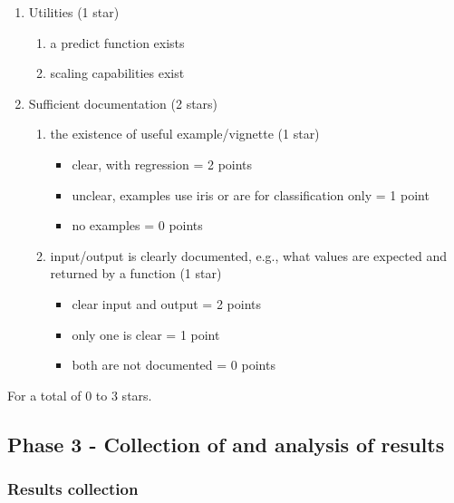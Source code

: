 \begin{enumerate}
\def\labelenumi{(\arabic{enumi})}
\tightlist
\item
  Utilities (1 star)

  \begin{enumerate}
  \def\labelenumii{(\alph{enumii})}
  \tightlist
  \item
    a predict function exists\\
  \item
    scaling capabilities exist
  \end{enumerate}
\item
  Sufficient documentation (2 stars)

  \begin{enumerate}
  \def\labelenumii{(\alph{enumii})}
  \tightlist
  \item
    the existence of useful example/vignette (1 star)

    \begin{itemize}
    \tightlist
    \item
      clear, with regression = 2 points
    \item
      unclear, examples use iris or are for classification only = 1
      point
    \item
      no examples = 0 points
    \end{itemize}
  \item
    input/output is clearly documented, e.g., what values are expected
    and returned by a function (1 star)

    \begin{itemize}
    \tightlist
    \item
      clear input and output = 2 points
    \item
      only one is clear = 1 point
    \item
      both are not documented = 0 points
    \end{itemize}
  \end{enumerate}
\end{enumerate}

For a total of 0 to 3 stars.

\hypertarget{phase-3---collection-of-and-analysis-of-results}{%
\subsection{Phase 3 - Collection of and analysis of
results}\label{phase-3---collection-of-and-analysis-of-results}}

\hypertarget{results-collection}{%
\subsubsection{Results collection}\label{results-collection}}

